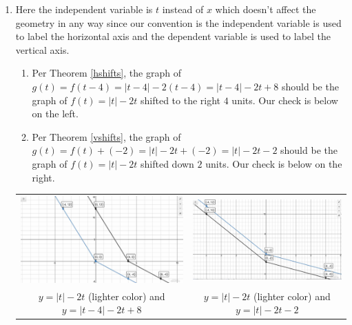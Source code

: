 \begin{ex}
\begin{enumerate}
\begin{enumerate}
 \end{enumerate}
 
 \item  Here the independent variable is $t$ instead of $x$ which doesn't affect the geometry in any way since our convention is the independent variable is used to label the horizontal axis and the dependent variable is used to label the vertical axis.  
 
 \begin{enumerate}
 
 \item  Per Theorem \ref{hshifts}, the graph of $g(t) = f(t-4) = |t-4|-2(t-4) = |t-4|-2t+8$ should be the graph of $f(t) = |t|-2t$ shifted to the right $4$ units. Our check is below on the left.
  
 \item Per Theorem \ref{vshifts},  the graph of $g(t) = f(t)+(-2) = |t|-2t+(-2) = |t|-2t-2$ should be the graph of  $f(t) = |t|-2t$ shifted down $2$ units. Our check is below on the right.
 
  \end{enumerate}
 
\begin{center}

\begin{tabular}{cc}

\includegraphics[width=3in]{./TransformationsGraphics/TransformationsEx01a.jpg} & \includegraphics[width=3in]{./TransformationsGraphics/TransformationsEx01b.jpg} \\

$y =  |t|-2t$ (lighter color)  and $y = |t-4|-2t+8$  &  $y =  |t|-2t$ (lighter color) and $y =  |t|-2t-2$ \\


\end{tabular}
\end{center}
\end{enumerate}
\end{ex}
